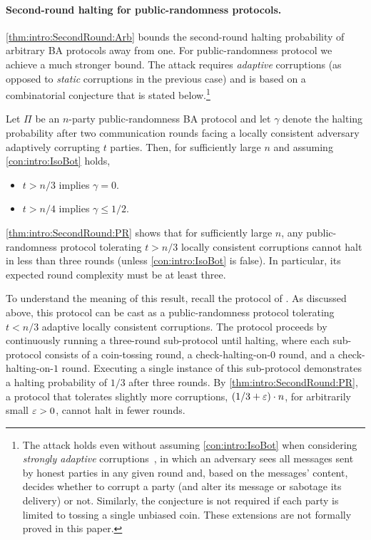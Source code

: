 \paragraph{Second-round halting for public-randomness protocols.}
\cref{thm:intro:SecondRound:Arb} bounds the second-round halting probability of arbitrary BA protocols away from one. For public-randomness protocol we achieve a much stronger bound. The attack requires \emph{adaptive} corruptions (as opposed to \emph{static} corruptions in the previous case) and is based on a combinatorial conjecture that is stated below.\footnote{The attack holds even without assuming \cref{con:intro:IsoBot} when considering \emph{strongly adaptive} corruptions~\cite{GKP15}, in which an adversary sees all messages sent by honest parties in any given round and, based on the messages' content, decides whether to corrupt a party (and alter its message or sabotage its delivery) or not. Similarly, the conjecture is not required if each party is limited to tossing a single unbiased coin. These extensions are not formally proved in this paper.\label{footnote:no_conjecture}}

\begin{theorem}\label{thm:intro:SecondRound:PR}
Let $\Pi$ be an $n$-party public-randomness BA protocol and let $\gamma$ denote the halting probability after two communication rounds facing a locally consistent adversary adaptively corrupting $t$ parties.
Then, for sufficiently large $n$ and assuming \cref{con:intro:IsoBot} holds,
\begin{itemize}
\item $t > n/3$ implies $\gamma=0$.
\item $t > n/4$ implies $\gamma \leq 1/2$.
\end{itemize}
\end{theorem}

\cref{thm:intro:SecondRound:PR} shows that for sufficiently large $n$, any public-randomness protocol tolerating $t>n/3$ locally consistent corruptions cannot halt in less than three rounds (unless \cref{con:intro:IsoBot} is false). In particular, its expected round complexity must be at least three.

To understand the meaning of this result, recall the protocol of \citet{Micali17}. As discussed above, this protocol can be cast as a public-randomness protocol tolerating $t<n/3$ adaptive locally consistent corruptions. The protocol proceeds by continuously running a three-round sub-protocol until halting, where each sub-protocol consists of a coin-tossing round, a check-halting-on-$0$ round, and a check-halting-on-$1$ round. Executing a single instance of this sub-protocol demonstrates a halting probability of $1/3$ after three rounds.
By \cref{thm:intro:SecondRound:PR}, a protocol that tolerates slightly more corruptions, \ie $(1/3 +\varepsilon) \cdot n$, for arbitrarily small $\varepsilon>0$, cannot halt in fewer rounds.


